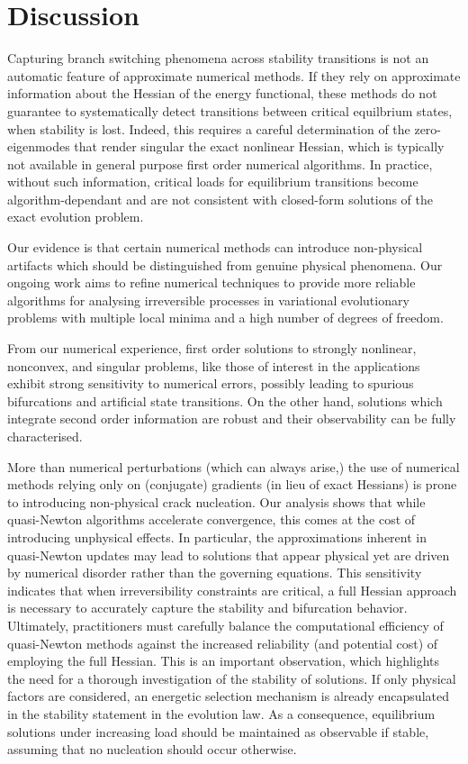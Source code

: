 
\section{Discussion}
\label{sec:discussion}
Capturing branch switching phenomena across stability transitions is not an automatic feature of approximate numerical methods. If they rely on approximate information about the Hessian of the energy functional, these methods do not guarantee to systematically detect transitions between critical equilbrium states, when stability is lost.
Indeed, this requires a careful determination of the zero-eigenmodes that render singular the exact nonlinear Hessian, which is typically not available in general purpose first order numerical algorithms.
In practice, without such information, critical loads for equilibrium transitions become algorithm-dependant and are not consistent with closed-form solutions of the exact evolution problem.


Our evidence is that certain numerical methods can introduce non-physical artifacts which should be distinguished from genuine physical phenomena. Our ongoing work aims to refine numerical techniques to provide more reliable algorithms for analysing irreversible processes in variational evolutionary problems with multiple local minima and a high number of degrees of freedom.

From our numerical experience, first order solutions to strongly nonlinear, nonconvex, and singular problems, like those of interest in the applications exhibit strong sensitivity to numerical errors, possibly leading to spurious bifurcations and artificial state transitions. On the other hand, solutions which integrate second order information are robust and their observability can be fully characterised.

More than numerical perturbations (which can always arise,) the use of numerical methods relying only on (conjugate) gradients (in lieu of exact Hessians) is prone to introducing non-physical crack nucleation.
      {Our analysis shows that while quasi-Newton algorithms accelerate convergence, this comes at the cost of introducing unphysical effects. In particular, the approximations inherent in quasi-Newton updates may lead to solutions that appear physical yet are driven by numerical disorder rather than the governing equations.
            This sensitivity indicates that when irreversibility constraints are critical, a full Hessian approach is  necessary to accurately capture the stability and bifurcation behavior.
            Ultimately, practitioners must carefully balance the computational efficiency of quasi-Newton methods against the increased reliability (and potential cost) of employing the full Hessian.}
This is an important observation, which highlights the need for a thorough investigation of the stability of solutions.
If only physical factors are considered, an energetic selection mechanism is already encapsulated in the stability statement in the evolution law. As a consequence, equilibrium solutions under increasing load should be maintained as observable if stable, assuming that no nucleation should occur otherwise.

